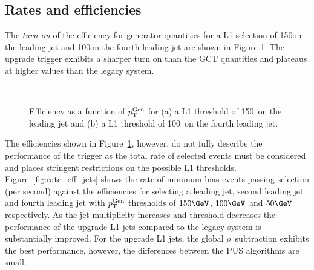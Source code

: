 \subsection{Rates and efficiencies}

The \emph{turn on} of the efficiency for generator quantities for a L1 selection of 150\GeV on the leading jet
and 100\GeV on the fourth leading jet are shown in Figure \ref{fig:turnon}. The upgrade trigger exhibits a sharper turn on
than the GCT quantities and plateaus at higher values than the legacy system. 

\begin{figure}
    \begin{center} 
	~
	\caption{Efficiency as a function of ${p_{\text T}^{\text{Gen}}}$ for (a) a L1 threshold of 150\GeV~on the leading jet and (b) 
	a L1 threshold of 100\GeV~on the fourth leading jet.}
	    \label{fig:turnon}
    \end{center} 
\end{figure}



The efficiencies shown in Figure~\ref{fig:turnon}, however, do not fully describe the performance 
of the trigger as the total rate of selected events must be considered and places 
stringent restrictions on the possible L1 thresholds. Figure~\ref{fig:rate_eff_jets} shows the rate of 
minimum bias events passing selection (per second) against the efficiencies for selecting 
a leading jet, second leading jet and fourth leading jet with ${p_{\text T}^{\text{Gen}}}$ thresholds of $150\GeV$,
$100\GeV$ and $50\GeV$ respectively. As the jet multiplicity increases and threshold decreases
the performance of the upgrade L1 jets compared to the legacy system is substantially improved.
For the upgrade L1 jets, the global $\rho$~subtraction exhibits the best performance, however, the differences 
between the PUS algorithms are small.

